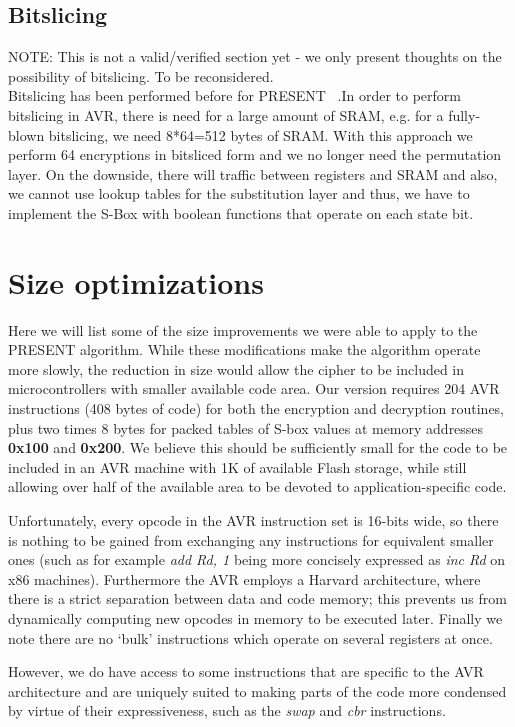 \documentclass{llncs}
\begin{document}
\subsection{Bitslicing}
NOTE: This is not a valid/verified section yet - we only present thoughts on the possibility of bitslicing. To be reconsidered.\\
Bitslicing has been performed before for PRESENT ~\cite{grabher2008light}.In order to perform bitslicing in AVR, there is need for a large amount of SRAM, e.g. for a fully-blown bitslicing, we need 8*64=512 bytes of SRAM. With this approach we perform 64 encryptions in bitsliced form and we no longer need the permutation layer. On the downside, there will traffic between registers and SRAM and also, we cannot use lookup tables for the substitution layer and thus, we have to implement the S-Box with boolean functions that operate on each state bit.

\section{Size optimizations}

Here we will list some of the size improvements we were able to apply to the PRESENT algorithm.
While these modifications make the algorithm operate more slowly, the reduction in size would allow the cipher to be included in microcontrollers with smaller available code area.
Our version requires 204 AVR instructions (408 bytes of code) for both the encryption and decryption routines, plus two times 8 bytes for packed tables of S-box values at memory addresses \textbf{0x100} and \textbf{0x200}.
We believe this should be sufficiently small for the code to be included in an AVR machine with 1K of available Flash storage, while still allowing over half of the available area to be devoted to application-specific code.

Unfortunately, every opcode in the AVR instruction set is 16-bits wide, so there is nothing to be gained from exchanging any instructions for equivalent smaller ones (such as for example \textit{add Rd, 1} being more concisely expressed as \textit{inc Rd} on x86 machines).
Furthermore the AVR employs a Harvard architecture, where there is a strict separation between data and code memory; this prevents us from dynamically computing new opcodes in memory to be executed later.
Finally we note there are no `bulk' instructions which operate on several registers at once.

However, we do have access to some instructions that are specific to the AVR architecture and are uniquely suited to making parts of the code more condensed by virtue of their expressiveness, such as the \textit{swap} and \textit{cbr} instructions.
\end{document}
